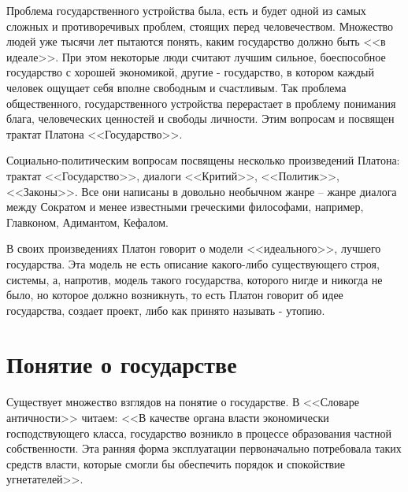	Проблема государственного устройства была, есть и будет одной из самых сложных 
	и противоречивых проблем, стоящих перед человечеством. Множество людей уже 
	тысячи лет пытаются понять, каким государство должно быть <<в идеале>>. При этом 
	некоторые люди считают лучшим сильное, боеспособное государство с хорошей 
	экономикой, другие - государство, в котором каждый человек ощущает себя вполне 
	свободным и счастливым. Так проблема общественного, государственного устройства 
	перерастает в проблему понимания блага, человеческих ценностей и свободы 
	личности. Этим вопросам и посвящен трактат Платона <<Государство>>.

	Социально-политическим вопросам посвящены несколько произведений Платона: 
	трактат <<Государство>>, диалоги <<Критий>>, <<Политик>>, <<Законы>>. Все они 
	написаны в довольно необычном жанре -- жанре диалога между Сократом и менее 
	известными греческими философами, например, Главконом, Адимантом, Кефалом. 

	В своих произведениях Платон говорит о модели <<идеального>>, лучшего 
	государства. Эта модель не есть описание какого-либо существующего строя, 
	системы, а, напротив, модель такого государства, которого нигде и никогда 
	не было, но которое должно возникнуть, то есть Платон говорит об идее 
	государства, создает проект, либо как принято называть - утопию.

\chapter{Понятие о государстве}
	Существует множество взглядов на понятие о государстве. В <<Словаре 
	античности>> читаем: <<В качестве органа власти экономически 
	господствующего класса, государство возникло в процессе образования 
	частной собственности. Эта ранняя форма эксплуатации первоначально 
	потребовала таких средств власти, которые смогли бы обеспечить порядок 
	и спокойствие угнетателей>>. 

